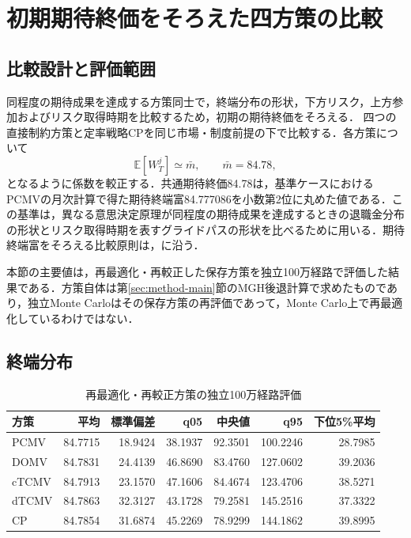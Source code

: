 \documentclass[10pt,a4paper]{article}
\theoremstyle{plain}
\theoremstyle{definition}
\newcommand{\E}{\mathbb{E}}
\begin{document}
\section{初期期待終価をそろえた四方策の比較}\label{sec:numerical-results}
\label{sec:all-strategy-numerics}

\subsection{比較設計と評価範囲}
同程度の期待成果を達成する方策同士で，終端分布の形状，下方リスク，上方参加およびリスク取得時期を比較するため，初期の期待終価をそろえる．
四つの直接制約方策と定率戦略CPを同じ市場・制度前提の下で比較する．各方策について
\begin{equation}
  \E[W_T^j]\simeq\bar m,\qquad \bar m=84.78,
  \label{eq:equal-mean-calibration}
\end{equation}
となるように係数を較正する．共通期待終価84.78は，基準ケースにおけるPCMVの月次計算で得た期待終端富84.777086を小数第2位に丸めた値である．この基準は，異なる意思決定原理が同程度の期待成果を達成するときの退職金分布の形状とリスク取得時期を表すグライドパスの形状を比べるために用いる．期待終端富をそろえる比較原則は，\citet{vanStadenDangForsyth2021}に沿う．

本節の主要値は，再最適化・再較正した保存方策を独立100万経路で評価した結果である．方策自体は第\ref{sec:method-main}節のMGH後退計算で求めたものであり，独立Monte Carloはその保存方策の再評価であって，Monte Carlo上で再最適化しているわけではない．

\subsection{終端分布}
\label{sec:monthly-baseline-results}

\begin{table}[htbp]
\centering\small
\caption{再最適化・再較正方策の独立100万経路評価}
\label{tab:all-strategy-results}
\begin{tabular}{lrrrrrr}
\toprule
方策 & 平均 & 標準偏差 & q05 & 中央値 & q95 & 下位5\%平均 \\
\midrule
PCMV  & 84.7715 & 18.9424 & 38.1937 & 92.3501 & 100.2246 & 28.7985 \\
DOMV  & 84.7831 & 24.4139 & 46.8690 & 83.4760 & 127.0602 & 39.2036 \\
cTCMV & 84.7913 & 23.1570 & 47.1606 & 84.4674 & 123.4706 & 38.5271 \\
dTCMV & 84.7863 & 32.3127 & 43.1728 & 79.2581 & 145.2516 & 37.3322 \\
CP    & 84.7854 & 31.6874 & 45.2269 & 78.9299 & 144.1862 & 39.8995 \\
\bottomrule
\end{tabular}
\end{table}
\end{document}
